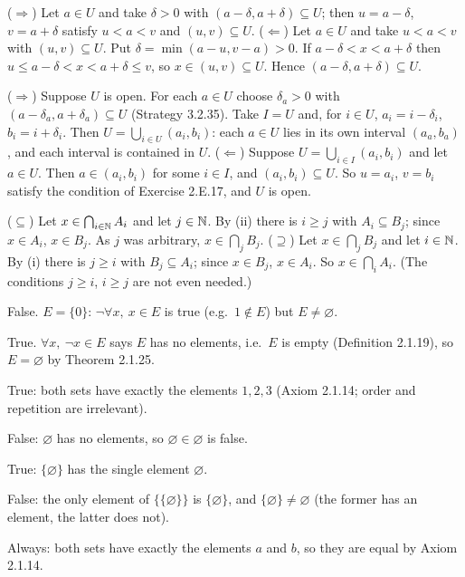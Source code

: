  ($\Rightarrow$) Let $a\in U$ and take $\delta>0$ with $(a-\delta,a+\delta)\subseteq U$; then $u=a-\delta$, $v=a+\delta$ satisfy $u<a<v$ and $(u,v)\subseteq U$. ($\Leftarrow$) Let $a\in U$ and take $u<a<v$ with $(u,v)\subseteq U$. Put $\delta=\min(a-u,v-a)>0$. If $a-\delta<x<a+\delta$ then $u\le a-\delta<x<a+\delta\le v$, so $x\in(u,v)\subseteq U$. Hence $(a-\delta,a+\delta)\subseteq U$.

 ($\Rightarrow$) Suppose $U$ is open. For each $a\in U$ choose $\delta_a>0$ with $(a-\delta_a,a+\delta_a)\subseteq U$ (Strategy 3.2.35). Take $I=U$ and, for $i\in U$, $a_i=i-\delta_i$, $b_i=i+\delta_i$. Then $U=\bigcup_{i\in U}(a_i,b_i)$: each $a\in U$ lies in its own interval $(a_a,b_a)$, and each interval is contained in $U$. ($\Leftarrow$) Suppose $U=\bigcup_{i\in I}(a_i,b_i)$ and let $a\in U$. Then $a\in(a_i,b_i)$ for some $i\in I$, and $(a_i,b_i)\subseteq U$. So $u=a_i$, $v=b_i$ satisfy the condition of Exercise 2.E.17, and $U$ is open.

 ($\subseteq$) Let $x\in\bigcap_{i\in\mathbb{N}}A_i$ and let $j\in\mathbb{N}$. By (ii) there is $i\ge j$ with $A_i\subseteq B_j$; since $x\in A_i$, $x\in B_j$. As $j$ was arbitrary, $x\in\bigcap_jB_j$. ($\supseteq$) Let $x\in\bigcap_jB_j$ and let $i\in\mathbb{N}$. By (i) there is $j\ge i$ with $B_j\subseteq A_i$; since $x\in B_j$, $x\in A_i$. So $x\in\bigcap_iA_i$. (The conditions $j\ge i$, $i\ge j$ are not even needed.)

 False. $E=\{0\}$: $\neg\forall x,\ x\in E$ is true (e.g.\ $1\notin E$) but $E\ne\varnothing$.

 True. $\forall x,\ \neg x\in E$ says $E$ has no elements, i.e.\ $E$ is empty (Definition 2.1.19), so $E=\varnothing$ by Theorem 2.1.25.

 True: both sets have exactly the elements $1,2,3$ (Axiom 2.1.14; order and repetition are irrelevant).

 False: $\varnothing$ has no elements, so $\varnothing\in\varnothing$ is false.

 True: $\{\varnothing\}$ has the single element $\varnothing$.

 False: the only element of $\{\{\varnothing\}\}$ is $\{\varnothing\}$, and $\{\varnothing\}\ne\varnothing$ (the former has an element, the latter does not).

 Always: both sets have exactly the elements $a$ and $b$, so they are equal by Axiom 2.1.14.

